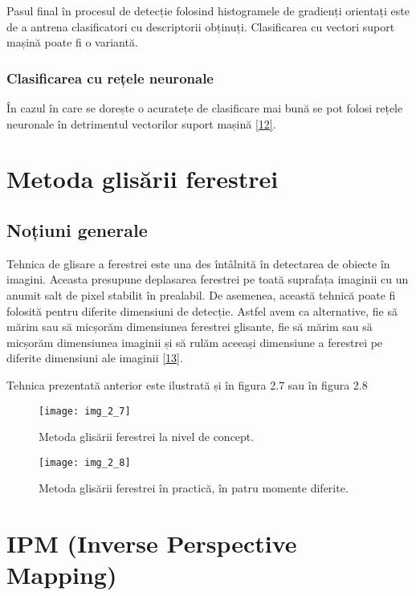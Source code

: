 Pasul final în procesul de detecție folosind histogramele de gradienți orientați este de a antrena clasificatori cu descriptorii obținuți. Clasificarea cu vectori suport mașină poate fi o variantă.

\subsubsection {Clasificarea cu rețele neuronale}

În cazul în care se dorește o acuratețe de clasificare mai bună se pot folosi rețele neuronale în detrimentul vectorilor suport mașină \hyperlink{NavneetDalalBillTriggs}{[12]}.

\section{Metoda glisării ferestrei}

\subsection{Noțiuni generale}

Tehnica de glisare a ferestrei este una des întâlnită în detectarea de obiecte în imagini. Aceasta presupune deplasarea ferestrei pe toată suprafața imaginii cu un anumit salt de pixel stabilit în prealabil. De asemenea, această tehnică poate fi folosită pentru diferite dimensiuni de detecție. Astfel avem ca alternative, fie să mărim sau să micșorăm dimensiunea ferestrei glisante, fie să mărim sau să micșorăm dimensiunea imaginii și să rulăm aceeași dimensiune a ferestrei pe diferite dimensiuni ale imaginii \hyperlink{RichardSzeliski}{[13]}.

Tehnica prezentată anterior este ilustrată și în figura 2.7 sau în figura 2.8
\begin{figure}[!h]
	\centering
	\texttt{[image: img\_2\_7]}
	\caption{Metoda glisării ferestrei la nivel de concept.}
	\label{fig:nonfloat}
\end{figure}
\begin{figure}[!h]
	\centering
	\texttt{[image: img\_2\_8]}
	\caption{Metoda glisării ferestrei în practică, în patru momente diferite.}
	\label{fig:nonfloat}
\end{figure}

\section{IPM (Inverse Perspective Mapping)}

